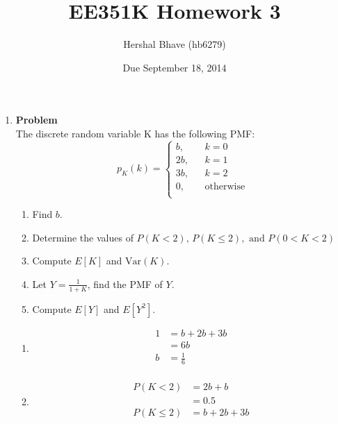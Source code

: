 \documentclass[12pt]{article}
\title{EE351K Homework 3}
\author{Hershal Bhave (hb6279)}
\date{Due September 18, 2014}
\newenvironment{Ex}{\textbf{Problem}\vspace{.75em}\\}{}
\begin{document}
\maketitle
\begin{enumerate}
\item
  \begin{Ex}
    The discrete random variable K has the following PMF:
    \begin{equation*}
      p_K(k) = \left\{
        \begin{aligned}
          b, && k=0 \\
          2b, && k=1 \\
          3b, && k=2 \\
          0, && \text{otherwise} \\
        \end{aligned}
      \end{equation*}
      \begin{enumerate}
      \item Find $b$.
      \item Determine the values of $P(K<2) \text{, } P(K \le 2),
        \text{ and } P(0<K<2)$
      \item Compute $E[K]$ and $\text{Var}(K)$.
      \item Let $Y = \frac{1}{1+K}$, find the PMF of $Y$.
      \item Compute $E[Y]$ and $E[Y^2]$.
      \end{enumerate}
      \begin{solution} \hfill
        \begin{enumerate}
        \item
          \begin{equation}
            \label{eq:1a-sol}
            \begin{aligned}
              1 &= b + 2b + 3b \\
              &= 6b \\
              b &= \frac{1}{6} \\
            \end{aligned}
          \end{equation}
        \item
          \begin{equation}
            \label{eq:1b-k-lt-2-sol}
            \begin{aligned}
              P(K<2) &= 2b + b \\
              &= 0.5 \\
              P(K\le2) &= b + 2b + 3b \\

\end{aligned}
\end{equation}
\end{enumerate}
\end{solution}
\end{Ex}
\end{enumerate}
\end{document}

